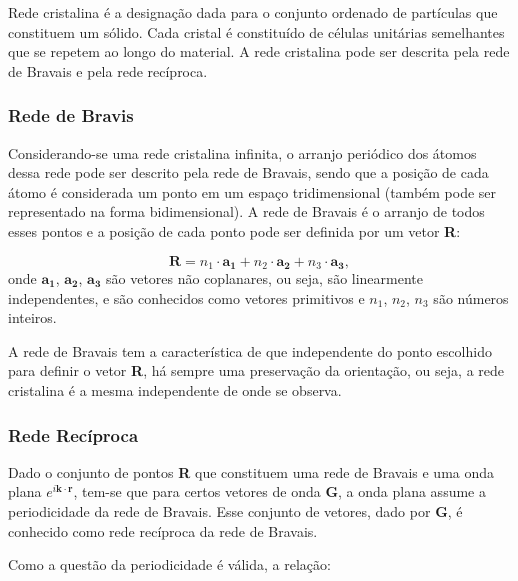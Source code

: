 \par Rede cristalina é a designação dada para o conjunto ordenado de partículas que constituem um sólido. Cada cristal é constituído de células unitárias semelhantes que se repetem ao longo do material. A rede cristalina pode ser descrita pela rede de Bravais e pela rede recíproca.\cite{qm_fis2}

    \subsubsection{Rede de Bravis}

      \par Considerando-se uma rede cristalina infinita, o arranjo periódico dos átomos dessa rede pode ser descrito pela rede de Bravais, sendo que a posição de cada átomo é considerada um ponto em um espaço tridimensional (também pode ser representado na forma bidimensional). A rede de Bravais é o arranjo de todos esses pontos e a posição de cada ponto pode ser definida por um vetor \textbf{R}: 

      \begin{equation}\label{redeBravis_eq1}
        \mathbf{R} = n_{1}\cdot \mathbf{a_{1}} + n_{2}\cdot \mathbf{a_{2}} + n_{3}\cdot \mathbf{a_{3}},
      \end{equation}
onde $\mathbf{a_{1}}$, $\mathbf{a_{2}}$, $\mathbf{a_{3}}$ são vetores não coplanares, ou seja, são linearmente independentes, e são conhecidos como vetores primitivos e $n_1$, $n_2$, $n_3$ são números inteiros.\cite{qm_fis5}

      \par A rede de Bravais tem a característica de que independente do ponto escolhido para definir o vetor \textbf{R}, há sempre uma preservação da orientação, ou seja, a rede cristalina é a mesma independente de onde se observa.\cite{qm_fis5}

    \subsubsection{Rede Recíproca}

      \par Dado o conjunto de pontos \textbf{R} que constituem uma rede de Bravais e uma onda plana $e^{i \mathbf{k\cdot r}}$, tem-se que para certos vetores de onda \textbf{G}, a onda plana assume a periodicidade da rede de Bravais. Esse conjunto de vetores, dado por \textbf{G}, é conhecido como rede recíproca da rede de Bravais.  
      
      \par Como a questão da periodicidade é válida, a relação:

